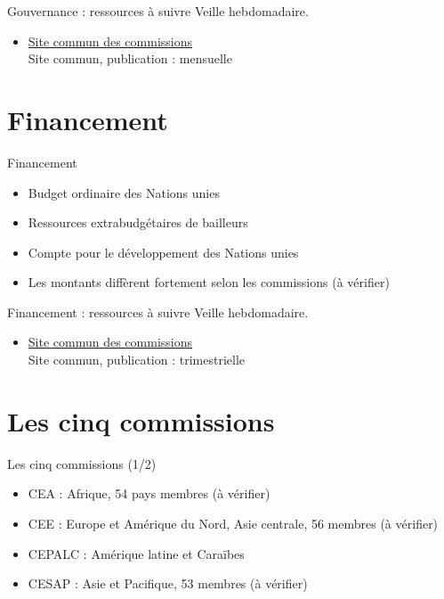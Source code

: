 \documentclass[aspectratio=169,11pt]{beamer}
\begin{document}
\begin{frame}{Gouvernance : ressources à suivre}
\small
Veille hebdomadaire.
\begin{itemize}
\item \href{https://www.regionalcommissions.org}{Site commun des commissions}\\{\footnotesize Site commun, publication : mensuelle}
\end{itemize}
\end{frame}

\section{Financement}
\begin{frame}{Financement}
\begin{itemize}
\item Budget ordinaire des Nations unies
\item Ressources extrabudgétaires de bailleurs
\item Compte pour le développement des Nations unies
\item Les montants diffèrent fortement selon les commissions (à vérifier)
\end{itemize}
\end{frame}

\begin{frame}{Financement : ressources à suivre}
\small
Veille hebdomadaire.
\begin{itemize}
\item \href{https://www.regionalcommissions.org}{Site commun des commissions}\\{\footnotesize Site commun, publication : trimestrielle}
\end{itemize}
\end{frame}

\section{Les cinq commissions}
\begin{frame}{Les cinq commissions (1/2)}
\begin{itemize}
\item CEA : Afrique, 54 pays membres (à vérifier)
\item CEE : Europe et Amérique du Nord, Asie centrale, 56 membres (à vérifier)
\item CEPALC : Amérique latine et Caraïbes
\item CESAP : Asie et Pacifique, 53 membres (à vérifier)
\end{itemize}
\end{frame}
\end{document}
